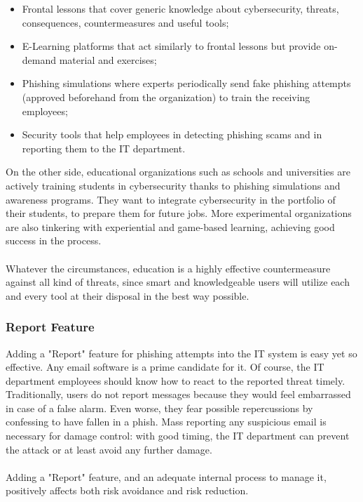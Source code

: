 \documentclass[a4paper]{article}
\begin{document}
\begin{itemize}
    \item Frontal lessons that cover generic knowledge about cybersecurity, threats, consequences, countermeasures and useful tools;
    \item E-Learning platforms that act similarly to frontal lessons but provide on-demand material and exercises;
    \item Phishing simulations where experts periodically send fake phishing attempts (approved beforehand from the organization) to train the receiving employees;
    \item Security tools that help employees in detecting phishing scams and in reporting them to the IT department.
\end{itemize}

On the other side, educational organizations such as schools and universities are actively training students in cybersecurity thanks to phishing simulations and awareness programs. They want to integrate cybersecurity in the portfolio of their students, to prepare them for future jobs. More experimental organizations are also tinkering with experiential and game-based learning, achieving good success in the process.
\\ \\
Whatever the circumstances, education is a highly effective countermeasure against all kind of threats, since smart and knowledgeable users will utilize each and every tool at their disposal in the best way possible.

\subsubsection{Report Feature}

Adding a "Report" feature for phishing attempts into the IT system is easy yet so effective. Any email software is a prime candidate for it. Of course, the IT department employees should know how to react to the reported threat timely. Traditionally, users do not report messages because they would feel embarrassed in case of a false alarm. Even worse, they fear possible repercussions by confessing to have fallen in a phish. Mass reporting any suspicious email is necessary for damage control: with good timing, the IT department can prevent the attack or at least avoid any further damage.
\\ \\
Adding a "Report" feature, and an adequate internal process to manage it, positively affects both risk avoidance and risk reduction.
\end{document}
